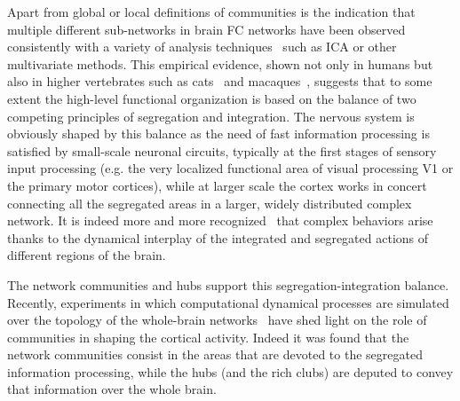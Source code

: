 Apart from global or local definitions of communities is the indication that multiple different sub-networks in brain FC networks have been observed consistently with a variety of analysis techniques~\cite{fox2005,deluca2006,schwarz2007} such as ICA or other multivariate methods.
This empirical evidence, shown not only in humans but also in higher vertebrates such as cats~\cite{scannell1995} and macaques~\cite{felleman1991}, suggests that to some extent the high-level functional organization is based on the balance of two competing principles of segregation and integration.
The nervous system is obviously shaped by this balance as the need of fast information processing is satisfied by small-scale neuronal circuits, typically at the first stages of sensory input processing (e.g.
the very localized functional area of visual processing V1 or the primary motor cortices), while at larger scale the cortex works in concert connecting all the segregated areas in a larger, widely distributed complex network.
It is indeed more and more recognized~\cite{tononi1994,tononi1998,deco2015} that complex behaviors arise thanks to the dynamical interplay of the integrated and segregated actions of different regions of the brain.

The network communities and hubs support this segregation-integration balance.
Recently, experiments in which computational dynamical processes are simulated over the topology of the whole-brain networks~\cite{deco2015} have shed light on the role of communities in shaping the cortical activity.
Indeed it was found that the network communities consist in the areas that are devoted to the segregated information processing, while the hubs (and the rich clubs) are deputed to convey that information over the whole brain.



